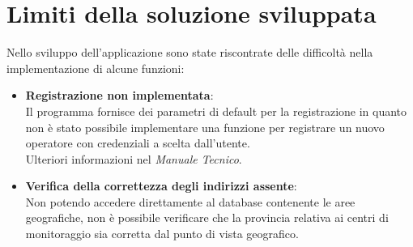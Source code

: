 \documentclass[12pt]{scrreprt}
\begin{document}
	\chapter{Limiti della soluzione sviluppata}
	Nello sviluppo dell'applicazione sono state riscontrate delle difficolt\`a nella implementazione di alcune funzioni:
	\begin{itemize}
		\item \textbf{Registrazione non implementata}:\\Il programma fornisce dei parametri di default per la registrazione in quanto non \`e stato possibile implementare una funzione per registrare un nuovo operatore con credenziali a scelta dall'utente.\\Ulteriori informazioni nel \textsl{Manuale Tecnico}.
		
		\item \textbf{Verifica della correttezza degli indirizzi assente}:\\Non potendo accedere direttamente al database contenente le aree geografiche, non \`e possibile verificare che la provincia relativa ai centri di monitoraggio sia corretta dal punto di vista geografico.
	\end{itemize}

	
	

	\nocite{IuriTex}
	
	
	\printindex
\end{document}
